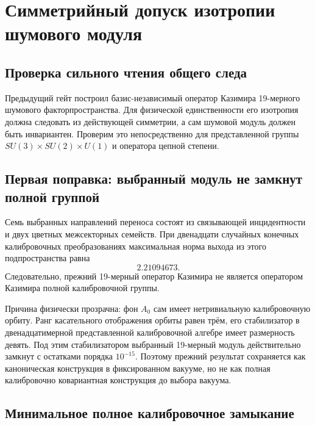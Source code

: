 \chapter{Симметрийный допуск изотропии шумового модуля}
\label{ch:v8-noise-isotropy-symmetry-admission-gate}

\section{Проверка сильного чтения общего следа}

Предыдущий гейт построил базис-независимый оператор Казимира 19-мерного шумового
факторпространства. Для физической единственности его изотропия должна следовать из
действующей симметрии, а сам шумовой модуль должен быть инвариантен.
Проверим это непосредственно для представленной группы
$SU(3)\times SU(2)\times U(1)$ и оператора цепной степени.

\section{Первая поправка: выбранный модуль не замкнут полной группой}

Семь выбранных направлений переноса состоят из связывающей инцидентности и
двух цветных межсекторных семейств. При двенадцати случайных конечных калибровочных
преобразованиях максимальная норма выхода из этого подпространства равна
\begin{equation}
 2.21094673.
 \label{eq:v8-selected-noise-gauge-leakage}
\end{equation}
Следовательно, прежний 19-мерный оператор Казимира не является оператором Казимира полной калибровочной
группы.

Причина физически прозрачна: фон $A_0$ сам имеет нетривиальную калибровочную орбиту.
Ранг касательного отображения орбиты равен трём, его стабилизатор в
двенадцатимерной представленной калибровочной алгебре имеет размерность девять.
Под этим стабилизатором выбранный 19-мерный модуль действительно замкнут с
остатками порядка $10^{-15}$. Поэтому прежний результат сохраняется как
каноническая конструкция в фиксированном вакууме, но не как полная
калибровочно ковариантная конструкция до выбора вакуума.

\section{Минимальное полное калибровочное замыкание}

